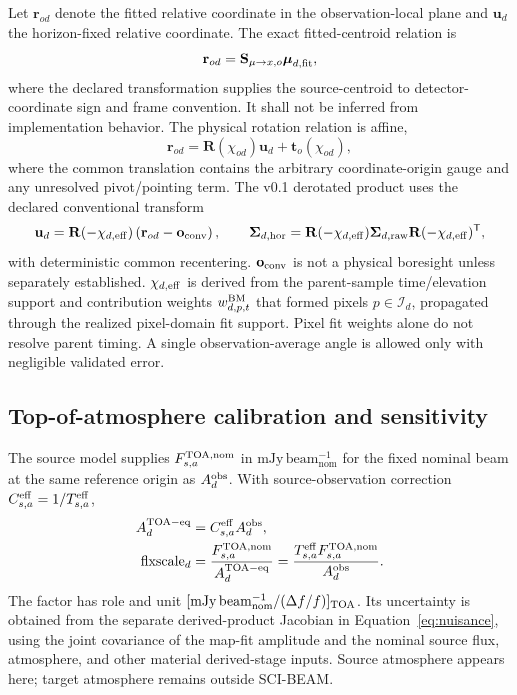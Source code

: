 Let $\mathbf r_{od}$ denote the fitted relative coordinate in the
observation-local plane and $\mathbf u_d$ the horizon-fixed relative
coordinate. The exact fitted-centroid relation is
\begin{equation}
\mathbf r_{od}=
\mathbf S_{\mu\rightarrow x,o}\boldsymbol\mu_{d,\rm fit},
\label{eq:centroid-to-detector}
\end{equation}
where the declared transformation supplies the source-centroid to
detector-coordinate sign and frame convention. It shall not be inferred from
implementation behavior. The physical rotation relation is affine,
\begin{equation}
\mathbf r_{od}=
\mathbf R(\chi_{od})\mathbf u_d+\mathbf t_o(\chi_{od}),
\label{eq:affine-rotation}
\end{equation}
where the common translation contains the arbitrary coordinate-origin gauge
and any unresolved pivot/pointing term. The v0.1 derotated product uses the
declared conventional transform
\begin{equation}
\mathbf u_d=
\mathbf R(-\chi_{d,\rm eff})
\left(\mathbf r_{od}-\mathbf o_{\rm conv}\right),
\qquad
\boldsymbol\Sigma_{d,\rm hor}=
\mathbf R(-\chi_{d,\rm eff})\boldsymbol\Sigma_{d,\rm raw}
\mathbf R(-\chi_{d,\rm eff})^\mathsf T,
\label{eq:derotation}
\end{equation}
with deterministic common recentering. $\mathbf o_{\rm conv}$ is not a
physical boresight unless separately established. $\chi_{d,\rm eff}$ is
derived from the parent-sample time/elevation support and contribution weights
$w^{\rm BM}_{d,p,t}$ that formed pixels $p\in\mathcal I_d$, propagated through
the realized pixel-domain fit support. Pixel fit weights alone do not resolve
parent timing. A single observation-average angle is allowed only with
negligible validated error.

\subsection{Top-of-atmosphere calibration and sensitivity}

The source model supplies $F^{\rm TOA,nom}_{s,a}$ in
$\mathrm{mJy\,beam_{nom}^{-1}}$ for the fixed nominal beam at the same
reference origin as $A_d^{\rm obs}$. With source-observation correction
$C^{\rm eff}_{s,a}=1/T^{\rm eff}_{s,a}$,
\begin{align}
A_d^{\rm TOA-eq}&=C^{\rm eff}_{s,a}A_d^{\rm obs},\\
\mathrm{flxscale}_d&=
\frac{F^{\rm TOA,nom}_{s,a}}{A_d^{\rm TOA-eq}}
=\frac{T^{\rm eff}_{s,a}F^{\rm TOA,nom}_{s,a}}{A_d^{\rm obs}} .
\label{eq:flxscale}
\end{align}
The factor has role and unit
$[\mathrm{mJy\,beam_{nom}^{-1}}/(\Delta f/f)]_{\rm TOA}$.
Its uncertainty is obtained from the separate derived-product Jacobian in
Equation~\ref{eq:nuisance}, using the joint covariance of the map-fit amplitude
and the nominal source flux, atmosphere, and other material derived-stage inputs.
Source atmosphere appears here; target atmosphere remains outside SCI-BEAM.

